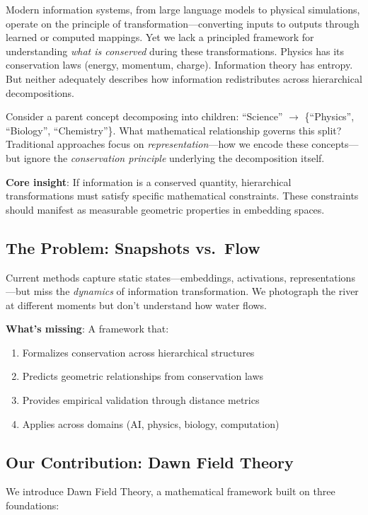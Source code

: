 \documentclass[11pt,a4paper]{article}
\begin{document}
Modern information systems, from large language models to physical simulations, operate on the principle of transformation---converting inputs to outputs through learned or computed mappings. Yet we lack a principled framework for understanding \emph{what is conserved} during these transformations. Physics has its conservation laws (energy, momentum, charge). Information theory has entropy. But neither adequately describes how information redistributes across hierarchical decompositions.

Consider a parent concept decomposing into children: ``Science'' $\to$ \{``Physics'', ``Biology'', ``Chemistry''\}. What mathematical relationship governs this split? Traditional approaches focus on \emph{representation}---how we encode these concepts---but ignore the \emph{conservation principle} underlying the decomposition itself.

\textbf{Core insight}: If information is a conserved quantity, hierarchical transformations must satisfy specific mathematical constraints. These constraints should manifest as measurable geometric properties in embedding spaces.

\subsection{The Problem: Snapshots vs.\ Flow}

Current methods capture static states---embeddings, activations, representations---but miss the \emph{dynamics} of information transformation. We photograph the river at different moments but don't understand how water flows.

\textbf{What's missing}: A framework that:
\begin{enumerate}
    \item Formalizes conservation across hierarchical structures
    \item Predicts geometric relationships from conservation laws
    \item Provides empirical validation through distance metrics
    \item Applies across domains (AI, physics, biology, computation)
\end{enumerate}

\subsection{Our Contribution: Dawn Field Theory}

We introduce Dawn Field Theory, a mathematical framework built on three foundations:
\end{document}
